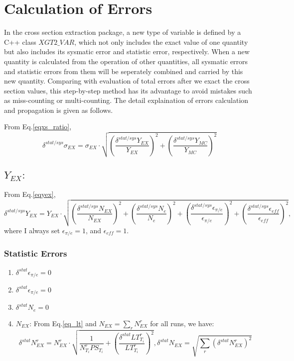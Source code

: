 \section{Calculation of Errors}
 In the cross section extraction package, a new type of variable is defined by a C++ class $XGT2\_VAR$, which not only includes the exact value of one quantity but also includes its sysmatic error and statistic error, respectively. When a new quantity is calculated from the operation of other quantities, all sysmatic errors and statistic errors from them will be seperately combined and carried by this new quantity. Comparing with evaluation of total errors after we exact the cross section values, this step-by-step method has its advantage to avoid mistakes such as miss-counting or multi-counting. The detail explaination of errors calculation and propagation is given as follows.

 From Eq.\ref{eqxs_ratio},
  \begin{equation}
  \delta^{stat/sys} \sigma_{EX} = \sigma_{EX} \cdot \sqrt{(\frac{\delta^{stat/sys} Y_{EX}}{Y_{EX}})^{2}+(\frac{\delta^{stat/sys} Y_{MC}}{Y_{MC}})^{2}}
\end{equation}

\subsection{$Y_{EX}:$}
 From Eq.\ref{eqyex},
\begin{equation}
  \delta^{stat/sys} Y_{EX} =  Y_{EX} \cdot \sqrt{(\frac{\delta^{stat/sys} N_{EX}}{N_{EX}})^{2}+(\frac{\delta^{stat/sys} N_{e}}{N_{e}})^{2}+(\frac{\delta^{stat/sys}\epsilon_{\pi/e}}{\epsilon_{\pi/e}})^{2}+(\frac{\delta^{stat/sys}\epsilon_{eff}}{\epsilon_{eff}})^{2}},
\end{equation}
where I always set $\epsilon_{\pi/e} = 1$, and $\epsilon_{eff} = 1$.

\subsubsection{Statistic Errors}
\begin{enumerate}

\item $\delta^{stat} \epsilon_{\pi/e} = 0$

\item $\delta^{stat} \epsilon_{\pi/e} = 0$

\item $\delta^{stat} N_{e} = 0$

\item \textbf{$N_{EX}$}: From  Eq.\ref{eq_lt} and $N_{EX}=\sum_{r}N_{EX}^{r}$ for all runs, we have:
\begin{equation}
  \delta^{stat} N_{EX}^{r} = N_{EX}^{r} \cdot \sqrt{\frac{1}{N_{T_{i}}^{r} PS_{T_{i}}} + (\frac{\delta^{stat} LT_{T_{i}}^{r}}{LT_{T_{i}}^{r}})^{2} }, \delta^{stat} N_{EX}=\sqrt{\sum_{r}(\delta^{stat} N_{EX}^{r})^{2}}
\end{equation}

\end{enumerate}

